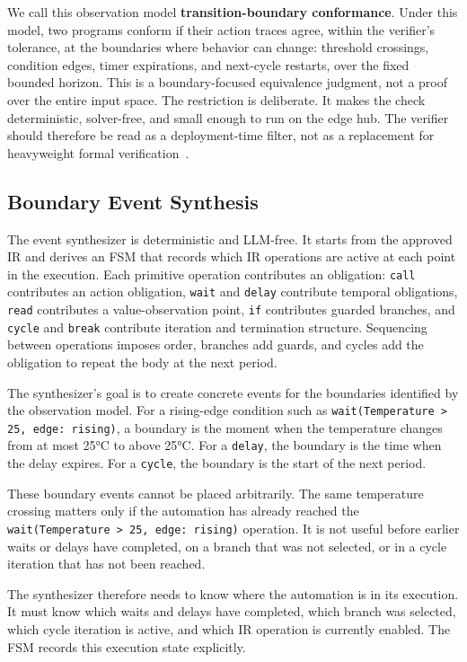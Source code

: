 \documentclass[sigconf,nonacm,anonymous,review]{acmart}
\begin{document}
We call this observation model \textbf{transition-boundary conformance}. Under this model, two programs conform if their action traces agree, within the verifier's tolerance, at the boundaries where behavior can change: threshold crossings, condition edges, timer expirations, and next-cycle restarts, over the fixed bounded horizon. This is a boundary-focused equivalence judgment, not a proof over the entire input space. The restriction is deliberate. It makes the check deterministic, solver-free, and small enough to run on the edge hub. The verifier should therefore be read as a deployment-time filter, not as a replacement for heavyweight formal verification~\cite{modelchecking}.

\subsection{Boundary Event Synthesis}

The event synthesizer is deterministic and LLM-free. It starts from the approved IR and derives an FSM that records which IR operations are active at each point in the execution. Each primitive operation contributes an obligation: \texttt{call} contributes an action obligation, \texttt{wait} and \texttt{delay} contribute temporal obligations, \texttt{read} contributes a value-observation point, \texttt{if} contributes guarded branches, and \texttt{cycle} and \texttt{break} contribute iteration and termination structure. Sequencing between operations imposes order, branches add guards, and cycles add the obligation to repeat the body at the next period.

The synthesizer's goal is to create concrete events for the boundaries identified by the observation model. For a rising-edge condition such as \texttt{wait(Temperature > 25, edge: rising)}, a boundary is the moment when the temperature changes from at most 25°C to above 25°C. For a \texttt{delay}, the boundary is the time when the delay expires. For a \texttt{cycle}, the boundary is the start of the next period.

These boundary events cannot be placed arbitrarily. The same temperature crossing matters only if the automation has already reached the \texttt{wait(Temperature > 25, edge: rising)} operation. It is not useful before earlier waits or delays have completed, on a branch that was not selected, or in a cycle iteration that has not been reached.

The synthesizer therefore needs to know where the automation is in its execution. It must know which waits and delays have completed, which branch was selected, which cycle iteration is active, and which IR operation is currently enabled. The FSM records this execution state explicitly.
\end{document}
